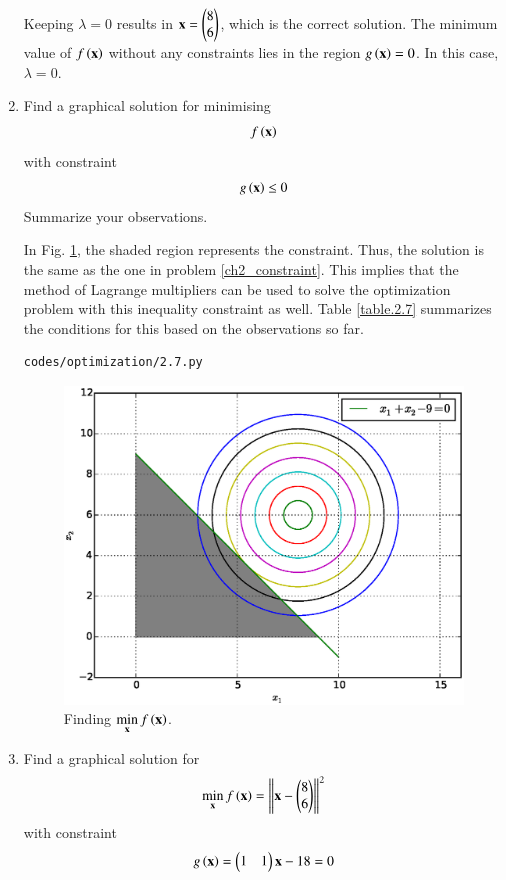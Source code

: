 \begin{enumerate}[label=\arabic*.,ref=\thesubsection.\theenumi]
\solution Keeping $\lambda = 0$ results in $\mathbf{x}=\begin{pmatrix} 8\\ 6\end{pmatrix}$, which is the correct solution.  The minimum value of $f\left(\mathbf{x}\right)$ without any constraints lies in the region $g\left(\mathbf{x}\right) = 0$.  In this case, $\lambda = 0$.  
%
%
\item
\label{ch2_constraint_border}
Find a graphical solution for minimising
\begin{align}
f\left(\mathbf{x}\right)
\end{align}
with constraint
\begin{align}
g\left(\mathbf{x}\right) \leq 0
\end{align}
Summarize your observations.

%
\solution In Fig. \ref{fig.2.7}, the shaded region represents the constraint.  Thus, the solution is the same as the one in problem \ref{ch2_constraint}. This implies that the method of
Lagrange multipliers can be used to solve the optimization problem with this inequality constraint as well.  Table \ref{table.2.7} summarizes the conditions for this based on the observations so far.
\begin{lstlisting}
codes/optimization/2.7.py
\end{lstlisting}

%
\begin{figure}[!ht]
\centering
\includegraphics[width=\columnwidth]{./optimization/figs/2.7.eps}
\caption{ Finding $ \displaystyle \min_{\mathbf{x}}f\left(\mathbf{x}\right)$.}
\label{fig.2.7}	
\end{figure}

%
\item
\label{ch2_prob_upper}
Find a graphical solution for 	 
	 \begin{align}
	 \label{ch2_second_min}
	\min_{\mathbf{x}} f\left(\mathbf{x}\right) = \left\lVert\mathbf{x}-\begin{pmatrix}8\\6\end{pmatrix}\right\rVert^2
	 \end{align}
	 with constraint
	 \begin{align}
	 \label{ch2_second_const}
	 g\left(\mathbf{x}\right) = \begin{pmatrix}1 & 1\end{pmatrix}\mathbf{x} - 18 = 0
	 \end{align}
	 

\end{enumerate}

